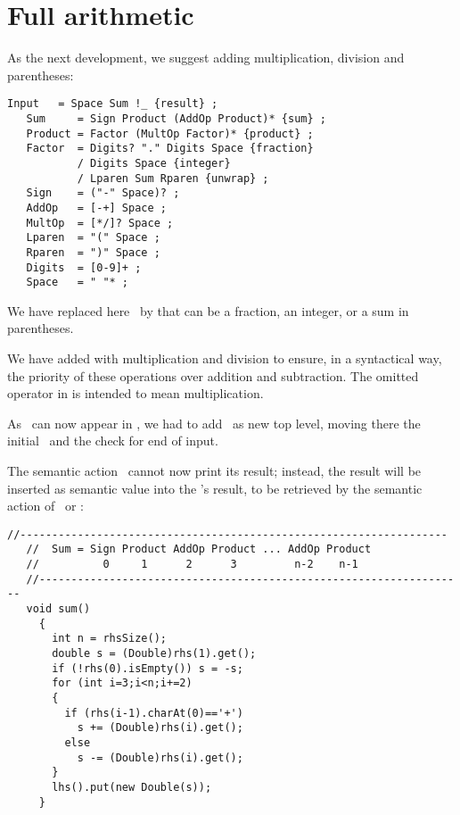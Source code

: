 
\section{Full arithmetic\label{arith}}


As the next development, we suggest adding multiplication, division
and parentheses:

\small
\begin{Verbatim}[frame=single,framesep=2mm,samepage=true,xleftmargin=15mm,xrightmargin=15mm,baselinestretch=0.8]
   Input   = Space Sum !_ {result} ;
   Sum     = Sign Product (AddOp Product)* {sum} ;
   Product = Factor (MultOp Factor)* {product} ;
   Factor  = Digits? "." Digits Space {fraction}
           / Digits Space {integer}
           / Lparen Sum Rparen {unwrap} ;
   Sign    = ("-" Space)? ;
   AddOp   = [-+] Space ;
   MultOp  = [*/]? Space ;
   Lparen  = "(" Space ;
   Rparen  = ")" Space ;
   Digits  = [0-9]+ ;
   Space   = " "* ;
\end{Verbatim}
\normalsize

We have replaced here \Number\ by  that can be 
a fraction, an integer, or a sum in parentheses.

We have added  with multiplication and division
to ensure, in a syntactical way, the priority of these operations
over addition and subtraction.
The omitted operator in  is intended to mean multiplication.

As \Sum\ can now appear in ,
we had to add \Input\ as new top level, 
moving there the initial \Space\ and the check for end of input.

The semantic action \Suma\ cannot now print its result;
instead, the result will be inserted as semantic value 
into the \Sum's result,
to be retrieved by the semantic action of \Input\ or \Factor:

\small
\begin{Verbatim}[frame=single,framesep=2mm,samepage=true,xleftmargin=15mm,xrightmargin=15mm,baselinestretch=0.8]
   //-------------------------------------------------------------------
   //  Sum = Sign Product AddOp Product ... AddOp Product
   //          0     1      2      3         n-2    n-1
   //-------------------------------------------------------------------
   void sum()
     {
       int n = rhsSize();
       double s = (Double)rhs(1).get();
       if (!rhs(0).isEmpty()) s = -s;
       for (int i=3;i<n;i+=2)
       {
         if (rhs(i-1).charAt(0)=='+')
           s += (Double)rhs(i).get();
         else
           s -= (Double)rhs(i).get();
       }
       lhs().put(new Double(s));
     }
\end{Verbatim}
\normalsize

